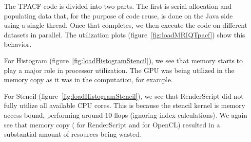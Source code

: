 The TPACF code is divided into two parts.
The first is serial allocation and populating data
  that, for the purpose of code reuse, is done on the 
  Java side using a single thread.
Once that completes, we then execute the code on different datasets in parallel.
The utilization plots (figure~\ref{fig:loadMRIQTpacf}) show this behavior.  

For Histogram (figure~\ref{fig:loadHistogramStencil}), we see that memory starts
  to play a major role in processor utilization.
The GPU was being utilized in the memory copy as it was in the computation, for example.

For Stencil (figure~\ref{fig:loadHistogramStencil}), we see that RenderScript did
  not fully utilize all available CPU cores.
This is because the stencil kernel is memory access bound, performing around 10 flops 
  (ignoring index calculations).
We again see that memory copy ( for RenderScript and
   for OpenCL) resulted in a substantial amount of resources being
  wasted.

